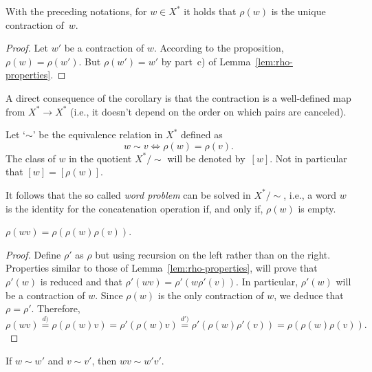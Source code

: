 \begin{cor}\label{cor:unique-reduced-word}
    With the preceding notations, for\/ $w\in X^*$ it holds that\/ $\rho(w)$ is the unique contraction of\/~$w$.
\end{cor}

\begin{proof}
    Let $w'$ be a contraction of $w$. According to the proposition, $\rho(w)=\rho(w')$. But $\rho(w')=w'$ by part~c) of Lemma~\ref{lem:rho-properties}.
\end{proof}

\begin{rem}
    A direct consequence of the corollary is that the contraction is a well-defined map from $X^*\to X^*$ (i.e., it doesn't depend on the order on which pairs are canceled).
\end{rem}

\begin{defn}\label{defn:similar-words}
    Let `$\sim$' be the equivalence relation in\/ $X^*$ defined as
    $$
        w\sim v \iff \rho(w)=\rho(v).
    $$
    The class of\/ $w$ in the quotient\/ $X^*/{\sim}$ will be denoted by\/~$[w]$. Not in particular that $[w]=[\rho(w)]$.
\end{defn}

\begin{rem}\label{rem:word-problem}
    It follows that the so called \textsl{word problem} can be solved in $X^*/{\sim}$, i.e., a word $w$ is the identity for the concatenation operation if, and only if, $\rho(w)$ is empty.
\end{rem}

\begin{prop}
    $\rho(wv)=\rho(\rho(w)\rho(v))$.
\end{prop}

\begin{proof}
    Define $\rho'$ as $\rho$ but using recursion on the left rather than on the right. Properties similar to those of Lemma~\ref{lem:rho-properties}, will prove that $\rho'(w)$ is reduced and that $\rho'(wv)=\rho'(w\rho'(v))$. In particular, $\rho'(w)$ will be a contraction of $w$. Since $\rho(w)$ is the only contraction of $w$, we deduce that $\rho=\rho'$. Therefore,
    $$
        \rho(wv) \stackrel{d)}= \rho(\rho(w)v)=\rho'(\rho(w)v)
            \stackrel{d')}= \rho'(\rho(w)\rho'(v)) = \rho(\rho(w)\rho(v)).
    $$
\end{proof}

\begin{cor}\label{cor:word-product}
    If\/ $w\sim w'$ and\/ $v\sim v'$, then\/ $wv\sim w'v'$.
\end{cor}

